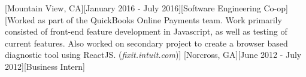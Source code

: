 \documentclass{resume}
\begin{document}
		[Mountain View, CA][January 2016 - July 2016][Software Engineering Co-op][Worked as part of the QuickBooks Online Payments team. Work primarily consisted of front-end feature development in Javascript, as well as testing of current features. Also worked on secondary project to create a browser based diagnostic tool using ReactJS. ({\it fixit.intuit.com})]%
		[Norcross, GA][June 2012 - July 2012][Business Intern]%
\end{document}
